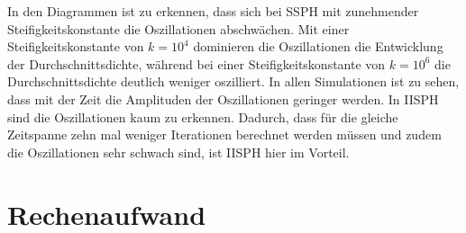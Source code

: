 \documentclass[11pt,
a4paper,
parskip=half, %
BCOR=10mm, %
english,
ngerman]{scrreprt}
\begin{document}
In den Diagrammen ist zu erkennen, dass sich bei SSPH mit zunehmender Steifigkeitskonstante die Oszillationen abschwächen.
Mit einer Steifigkeitskonstante von $k = 10^4$ dominieren die Oszillationen die Entwicklung der Durchschnittsdichte,
während bei einer Steifigkeitskonstante von $k = 10^6$ die Durchschnittsdichte deutlich weniger oszilliert.
In allen Simulationen ist zu sehen, dass mit der Zeit die Amplituden der Oszillationen geringer werden.
In IISPH sind die Oszillationen kaum zu erkennen.
Dadurch, dass für die gleiche Zeitspanne zehn mal weniger Iterationen berechnet werden müssen und zudem die Oszillationen sehr schwach sind,
ist IISPH hier im Vorteil.


\section{Rechenaufwand}
\end{document}
